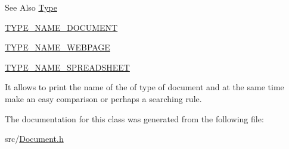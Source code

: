 \begin{DoxySeeAlso}{See Also}
\hyperlink{namespacedocs_a150efca62822b8ab62a5afabe299bf75}{Type} 

\hyperlink{namespacedocs_a88f8e41b03147cf4197261676999d12c}{T\-Y\-P\-E\-\_\-\-N\-A\-M\-E\-\_\-\-D\-O\-C\-U\-M\-E\-N\-T} 

\hyperlink{namespacedocs_ac41cf3635e22c3750deddd000fd4c34b}{T\-Y\-P\-E\-\_\-\-N\-A\-M\-E\-\_\-\-W\-E\-B\-P\-A\-G\-E} 

\hyperlink{namespacedocs_a3f58481f03c01b3da04828585d14ff77}{T\-Y\-P\-E\-\_\-\-N\-A\-M\-E\-\_\-\-S\-P\-R\-E\-A\-D\-S\-H\-E\-E\-T}
\end{DoxySeeAlso}
It allows to print the name of the of type of document and at the same time make an easy comparison or perhaps a searching rule. 

The documentation for this class was generated from the following file\-:\begin{DoxyCompactItemize}
\item 
src/\hyperlink{Document_8h}{Document.\-h}\end{DoxyCompactItemize}
